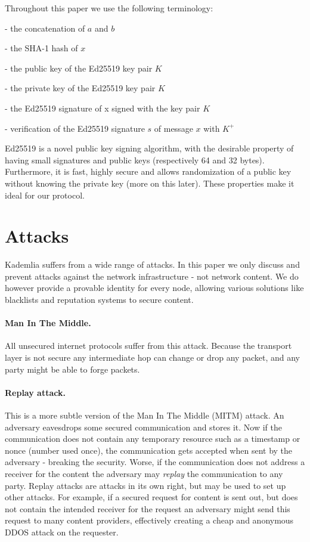 \documentclass[12pt]{article}
\begin{document}
Throughout this paper we use the following terminology:

\begin{description}[noitemsep]
    \item[$a || b$] - the concatenation of $a$ and $b$
    \item[$H(x)$] - the SHA-1 hash of $x$
    \item[$K^+$] - the public key of the Ed25519 key pair $K$
    \item[$K^-$] - the private key of the Ed25519 key pair $K$
    \item[$Sign(x, K)$] - the Ed25519 signature of x signed with the key pair $K$
    \item[$Verify(s, x, K^+)$] - verification of the Ed25519 signature $s$ of message $x$ with $K^+$
\end{description}

Ed25519 \cite{bernstein2011high} is a novel public key signing algorithm, with
the desirable property of having small signatures and public keys (respectively
64 and 32 bytes). Furthermore, it is fast, highly secure and allows
randomization of a public key without knowing the private key (more on this
later). These properties make it ideal for our protocol. 



\section{Attacks}

Kademlia suffers from a wide range of attacks. In this paper
we only discuss and prevent attacks against the network infrastructure - not
network content. We do however provide a provable identity for every node,
allowing various solutions like blacklists and reputation systems to secure
content.

\paragraph{Man In The Middle.} All unsecured internet protocols suffer from
this attack. Because the transport layer is not secure any intermediate hop can
change or drop any packet, and any party might be able to forge packets.

\paragraph{Replay attack.} This is a more subtle version of the Man In The
Middle (MITM) attack. An adversary eavesdrops some secured communication and
stores it. Now if the communication does not contain any temporary resource
such as a timestamp or nonce (number used once), the communication gets
accepted when sent by the adversary - breaking the security. Worse, if the
communication does not address a receiver for the content the adversary may
\emph{replay} the communication to any party. Replay attacks are attacks in
its own right, but may be used to set up other attacks. For example, if a
secured request for content is sent out, but does not contain the intended
receiver for the request an adversary might send this request to many content
providers, effectively creating a cheap and anonymous DDOS attack on the
requester.
\end{document}
